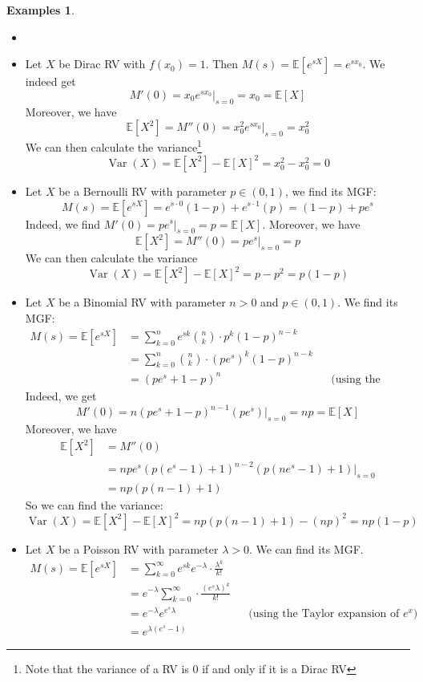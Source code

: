 \documentclass[paper=a4, fontsize=12pt]{scrartcl} %
\theoremstyle{definition}
\newtheorem{exmps}[thm]{Examples}
\theoremstyle{remark}
\newcommand{\E}{\mathbb{E}}
\DeclareMathOperator{\vari}{Var}
\numberwithin{equation}{section} %
\numberwithin{figure}{section} %
\numberwithin{table}{section} %
\begin{document}
\begin{exmps}
	\begin{itemize}
		\item[]
		\item Let $X$ be Dirac RV with $f(x_0) = 1$. Then $M(s) = \E[e^{sX}] = e^{sx_0}$. We indeed get \[M'(0) = x_0e^{sx_0}\vert_{s=0} = x_0 = \E[X]\] Moreover, we have \[\E[X^2] = M''(0) = x_0^2e^{sx_0}\vert_{s=0} = x_0^2\] We can then calculate the variance\footnote{Note that the variance of a RV is $0$ if and only if it is a Dirac RV} \[ \vari(X) = \E[X^2]-\E[X]^2 = x_0^2 - x_0^2 = 0\]
		\item Let $X$ be a Bernoulli RV with parameter $p \in (0,1)$, we find its MGF:
		\[M(s) = \E[e^{sX}] = e^{s\cdot 0}(1-p) + e^{s\cdot 1}(p) = (1-p) + pe^s\]
		Indeed, we find $M'(0) = pe^s\vert_{s=0} = p = \E[X]$. Moreover, we have 
		\[\E[X^2] = M''(0) = pe^s\vert_{s=0} = p\]
		We can then calculate the variance
		\[\vari(X) = \E[X^2]-\E[X]^2 = p-p^2 = p(1-p)\]
		\item Let $X$ be a Binomial RV with parameter $n > 0$ and $p \in (0,1)$. We find its MGF:
		\begin{align*}
		M(s) = \E[e^{sX}] &= \sum_{k=0}^n e^{sk} \binom{n}{k} \cdot p^k(1-p)^{n-k} \\&= \sum_{k=0}^n \binom{n}{k} \cdot (pe^s)^k(1-p)^{n-k}\\ 
		&= (pe^s + 1-p)^n&&\mbox{(using the binomial formula)}
		\end{align*}
		Indeed, we get
		\[M'(0) = n(pe^s + 1-p)^{n-1}(pe^s)\vert_{s=0} = np = \E[X]\]
		Moreover, we have
		\begin{align*}
		\E[X^2] &= M''(0) \\&= n p e^s (p (e^s - 1) + 1)^{n - 2} (p (n e^s - 1) + 1) \vert_{s=0} \\&= np(p(n-1)+1)
		\end{align*}
		So we can find the variance:
		\[ \vari(X) = \E[X^2]-\E[X]^2 = np(p(n-1)+1) - (np)^2 = np(1-p)\]
		\item Let $X$ be a Poisson RV with parameter $\lambda > 0$. We can find its MGF.
		\begin{align*}
		M(s) = \E[e^{sX}] &= \sum_{k=0}^{\infty} e^{sk} e^{-\lambda}\cdot \frac{\lambda^k}{k!}\\
		&= e^{-\lambda}\sum_{k=0}^{\infty} \cdot \frac{(e^s\lambda)^k}{k!}\\
		&= e^{-\lambda}e^{e^s\lambda} &&\mbox{(using the Taylor expansion of $e^x$)}\\
		&= e^{\lambda(e^s-1)}
		\end{align*}

\end{itemize}
\end{exmps}
\end{document}

